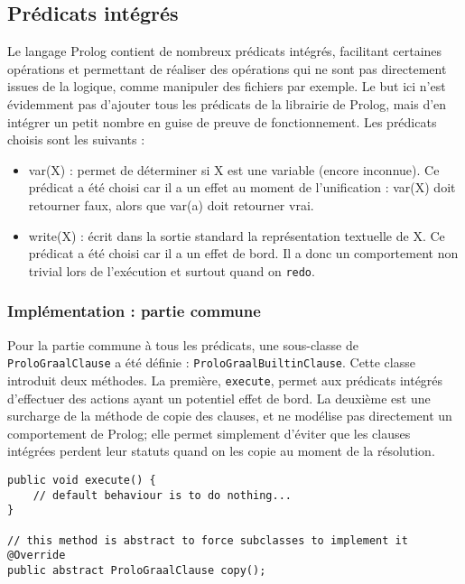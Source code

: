 \documentclass[../report.tex]{subfiles}
\begin{document}
\subsection{Prédicats intégrés}
Le langage Prolog contient de nombreux prédicats intégrés, facilitant certaines opérations et permettant de réaliser des opérations qui ne sont pas directement issues de la logique, comme manipuler des fichiers par exemple. Le but ici n'est évidemment pas d'ajouter tous les prédicats de la librairie de Prolog, mais d'en intégrer un petit nombre en guise de preuve de fonctionnement. Les prédicats choisis sont les suivants :
\begin{itemize}
    \item var(X) : permet de déterminer si X est une variable (encore inconnue). Ce prédicat a été choisi car il a un effet au moment de l'unification : var(X) doit retourner faux, alors que var(a) doit retourner vrai.
    \item write(X) : écrit dans la sortie standard la représentation textuelle de X. Ce prédicat a été choisi car il a un effet de bord. Il a donc un comportement non trivial lors de l'exécution et surtout quand on \texttt{redo}.
\end{itemize}
\subsubsection{Implémentation : partie commune}
Pour la partie commune à tous les prédicats, une sous-classe de \texttt{ProloGraalClause} a été définie : \texttt{ProloGraalBuiltinClause}. Cette classe introduit deux méthodes. La première, \texttt{execute}, permet aux prédicats intégrés d'effectuer des actions ayant un potentiel effet de bord. La deuxième est une surcharge de la méthode de copie des clauses, et ne modélise pas directement un comportement de Prolog; elle permet simplement d'éviter que les clauses intégrées perdent leur statuts quand on les copie au moment de la résolution.
\begin{verbatim}
public void execute() {
    // default behaviour is to do nothing...
}

// this method is abstract to force subclasses to implement it
@Override
public abstract ProloGraalClause copy();
\end{verbatim}
\end{document}
